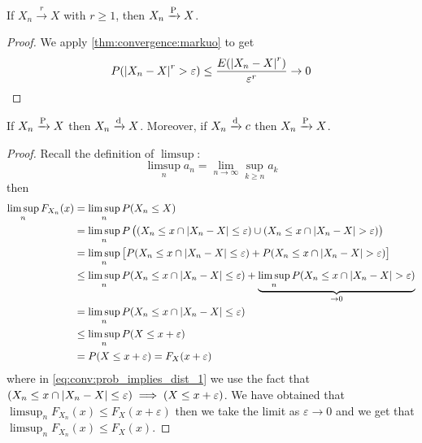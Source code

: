 \documentclass[12pt]{extarticle}
\newcommand{\convdist}{\xrightarrow{\operatorfont d}}
\newcommand{\convprob}{\xrightarrow{\operatorfont P}}
\newcommand{\convmean}[1]{\xrightarrow{#1}}
\begin{document}
\begin{theorem}
    If $X_n \convmean{r} X$ with $r \geq 1$, then $X_n \convprob X$.
\end{theorem}
\begin{proof}
    We apply \autoref{thm:convergence:markuo} to get
    \begin{equation}
        P(\abs{X_n - X}^r > \varepsilon) \leq \frac{E(\abs{X_n - X}^r)}{\varepsilon^r} \to 0
    \end{equation}
\end{proof}

\begin{theorem}
    If $X_n \convprob X$ then $X_n \convdist X$.
    Moreover, if $X_n \convdist c$ then $X_n \convprob X$.
\end{theorem}
\begin{proof}
    Recall the definition of $\limsup$:
    \begin{equation}
        \limsup_n a_n = \lim_{n \to \infty} \sup_{k \geq n} a_k
    \end{equation}
    then
    \begin{align}
        \limsup_n F_{X_n}(x) & = \limsup_n P(X_n \leq X)                                                                                                                      \\
                             & = \limsup_n P\left( (X_n \leq x \cap \abs{X_n -X} \leq \varepsilon) \cup (X_n \leq x \cap \abs{X_n -X} > \varepsilon)\right)                   \\
                             & = \limsup_n \left[P(X_n \leq x \cap \abs{X_n -X} \leq \varepsilon) + P(X_n \leq x \cap \abs{X_n -X} > \varepsilon)\right]                      \\
                             & \leq \limsup_n P(X_n \leq x \cap \abs{X_n -X} \leq \varepsilon) + \underbrace{\limsup_n P(X_n \leq x \cap \abs{X_n -X} > \varepsilon)}_{\to 0} \\
                             & = \limsup_n P(X_n \leq x \cap \abs{X_n -X} \leq \varepsilon)                                                                                   \\
                             & \leq \limsup_n P(X \leq x + \varepsilon) \label{eq:conv:prob_implies_dist_1}                                                                   \\
                             & = P(X \leq x + \varepsilon) = F_X(x + \varepsilon)
    \end{align}
    where in \autoref{eq:conv:prob_implies_dist_1} we use the fact that $(X_n \leq x \cap \abs{X_n -X} \leq \varepsilon) \implies (X \leq x + \varepsilon)$.
    We have obtained that $\limsup_n F_{X_n}(x) \leq F_X(x + \varepsilon)$ then we take the limit as $\varepsilon \to 0$ and we get that $\limsup_n F_{X_n}(x) \leq F_X(x)$.


\end{proof}
\end{document}
